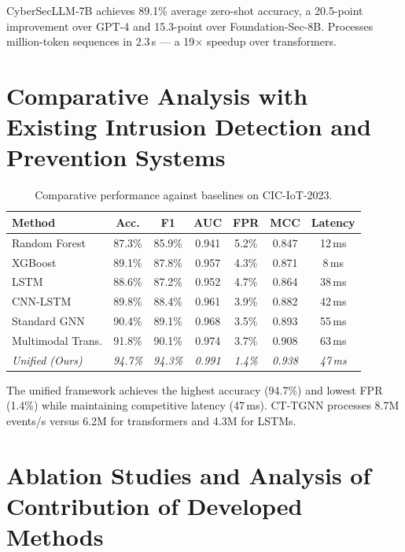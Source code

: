 CyberSecLLM-7B achieves 89.1\% average zero-shot accuracy, a 20.5-point improvement over GPT-4 and 15.3-point over Foundation-Sec-8B. Processes million-token sequences in 2.3\,s --- a 19$\times$ speedup over transformers.


\section{Comparative Analysis with Existing Intrusion Detection and Prevention Systems}
\label{sec:comparative}

\begin{table}[htbp]
\centering
\caption{Comparative performance against baselines on CIC-IoT-2023.}
\label{tab:comparative}
\begin{tabular}{lcccccc}
\toprule
Method & Acc. & F1 & AUC & FPR & MCC & Latency \\
\midrule
Random Forest      & 87.3\% & 85.9\% & 0.941 & 5.2\% & 0.847 & 12\,ms \\
XGBoost            & 89.1\% & 87.8\% & 0.957 & 4.3\% & 0.871 & 8\,ms \\
LSTM               & 88.6\% & 87.2\% & 0.952 & 4.7\% & 0.864 & 38\,ms \\
CNN-LSTM           & 89.8\% & 88.4\% & 0.961 & 3.9\% & 0.882 & 42\,ms \\
Standard GNN       & 90.4\% & 89.1\% & 0.968 & 3.5\% & 0.893 & 55\,ms \\
Multimodal Trans.  & 91.8\% & 90.1\% & 0.974 & 3.7\% & 0.908 & 63\,ms \\
\textit{Unified (Ours)}   & \textit{94.7\%} & \textit{94.3\%} & \textit{0.991} & \textit{1.4\%} & \textit{0.938} & \textit{47\,ms} \\
\bottomrule
\end{tabular}
\end{table}

The unified framework achieves the highest accuracy (94.7\%) and lowest FPR (1.4\%) while maintaining competitive latency (47\,ms). CT-TGNN processes 8.7M events/s versus 6.2M for transformers and 4.3M for LSTMs.


\section{Ablation Studies and Analysis of Contribution of Developed Methods}
\label{sec:ablation}

